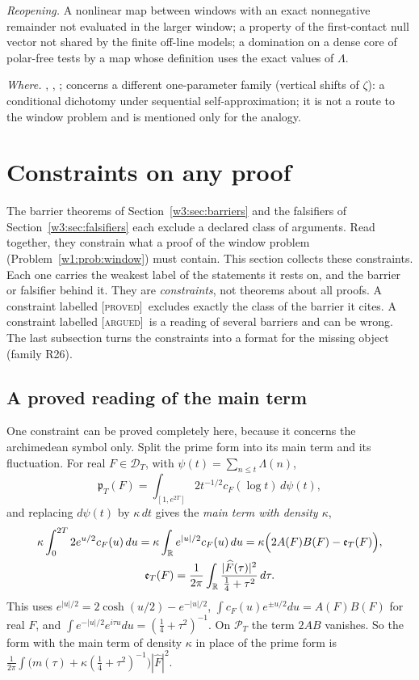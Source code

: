\documentclass[11pt]{amsart}
\theoremstyle{definition}
\theoremstyle{remark}
\numberwithin{equation}{section}
\newcommand{\R}{\mathbb{R}}
\newcommand{\Fh}{\widehat F}                           %
\newcommand{\cF}{c_F}                                  %
\newcommand{\PT}{\mathcal{P}_T}                        %
\newcommand{\DT}{\mathcal{D}_T}                        %
\newcommand{\pT}{\mathfrak{p}_T}                       %
\newcommand{\stag}[1]{\textsc{[#1]}}
\newcommand{\PROVED}{\stag{proved}}
\newcommand{\ARGUED}{\stag{argued}}
\newcommand{\entry}[1]{\par\smallskip\noindent\textit{#1.}\enspace}
\begin{document}
\entry{Reopening} A nonlinear map between windows with an exact nonnegative remainder not evaluated in the larger
window; a property of the first-contact null vector not shared by the finite off-line models; a domination on a dense
core of polar-free tests by a map whose definition uses the exact values of $\Lambda$.

\entry{Where} \cite{P27}, \cite{P29}, \cite[Theorems~4.1 and 24.1]{P39}; \cite{P30} concerns a different
one-parameter family (vertical shifts of $\zeta$): a conditional dichotomy under sequential self-approximation; it is not a
route to the window problem and is mentioned only for the analogy.


\section{Constraints on any proof}\label{w8:sec:constraints}

The barrier theorems of Section~\ref{w3:sec:barriers} and the falsifiers of Section~\ref{w3:sec:falsifiers} each exclude
a declared class of arguments. Read together, they constrain what a proof of the window problem
(Problem~\ref{w1:prob:window}) must contain. This section collects these constraints. Each one carries the weakest
label of the statements it rests on, and the barrier or falsifier behind it. They are \emph{constraints}, not
theorems about all proofs. A constraint labelled \PROVED\ excludes exactly the class of the barrier it cites. A
constraint labelled \ARGUED\ is a reading of several barriers and can be wrong. The last subsection turns the
constraints into a format for the missing object (family R26).

\subsection{A proved reading of the main term}

One constraint can be proved completely here, because it concerns the archimedean symbol only. Split the prime form
into its main term and its fluctuation. For real $F\in\DT$, with $\psi(t)=\sum_{n\le t}\Lambda(n)$,
\[
\pT(F)=\int_{[1,e^{2T}]}2t^{-1/2}\cF(\log t)\,d\psi(t),
\]
and replacing $d\psi(t)$ by $\kappa\,dt$ gives the \emph{main term with density $\kappa$},
\begin{gather*}
\kappa\int_0^{2T}2e^{u/2}\cF(u)\,du=\kappa\int_\R e^{|u|/2}\cF(u)\,du
=\kappa\Bigl(2A(F)B(F)-\mathfrak e_T(F)\Bigr),\\
\mathfrak e_T(F)=\frac1{2\pi}\int_\R\frac{|\Fh(\tau)|^2}{\frac14+\tau^2}\,d\tau .
\end{gather*}
This uses $e^{|u|/2}=2\cosh(u/2)-e^{-|u|/2}$, $\int\cF(u)e^{\pm u/2}du=A(F)B(F)$ for real $F$, and
$\int e^{-|u|/2}e^{i\tau u}du=(\frac14+\tau^2)^{-1}$. On $\PT$ the term $2AB$ vanishes. So the form with the
main term of density $\kappa$ in place of the prime form is
$\frac1{2\pi}\int\bigl(m(\tau)+\kappa(\tfrac14+\tau^2)^{-1}\bigr)|\Fh|^2$.
\end{document}
